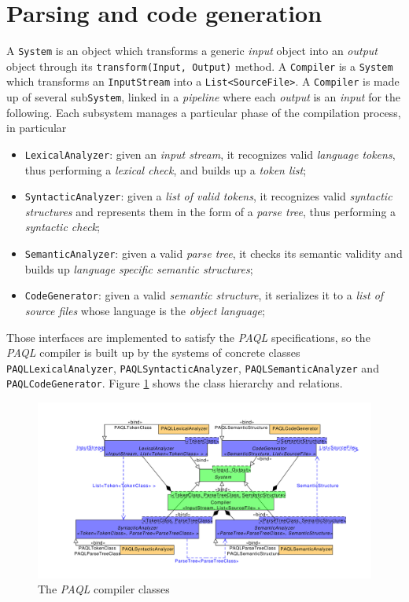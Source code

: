 \documentclass[10pt]{article}  %
\begin{document}
\section{Parsing and code generation}
    A \texttt{System} is an object which transforms a generic \emph{input} object into an \emph{output} object
    through its \texttt{transform(Input, Output)} method. A \texttt{Compiler} is a \texttt{System} which transforms an \texttt{InputStream}
    into a \texttt{List<SourceFile>}. A \texttt{Compiler} is made up of several sub\texttt{System}, linked in a \emph{pipeline} where
    each \emph{output} is an \emph{input} for the following. Each subsystem manages a particular phase of the compilation process,
    in particular
    \begin{itemize}
        \item \texttt{LexicalAnalyzer}: given an \emph{input stream}, it recognizes valid \emph{language tokens}, thus performing a
        \emph{lexical check}, and builds up a \emph{token list};
        \item \texttt{SyntacticAnalyzer}: given a \emph{list of valid tokens}, it recognizes valid \emph{syntactic structures}
        and represents them in the form of a \emph{parse tree}, thus performing a \emph{syntactic check};
        \item \texttt{SemanticAnalyzer}: given a valid \emph{parse tree}, it checks its semantic validity and builds up
        \emph{language specific semantic structures};
        \item \texttt{CodeGenerator}: given a valid \emph{semantic structure}, it serializes it to a \emph{list of source files}
        whose language is the \emph{object language};
    \end{itemize}
    Those interfaces are implemented to satisfy the \emph{PAQL} specifications, so the \emph{PAQL} compiler is built up by
    the systems of concrete classes \texttt{PAQLLexicalAnalyzer}, \texttt{PAQLSyntacticAnalyzer}, \texttt{PAQLSemanticAnalyzer} and
    \texttt{PAQLCodeGenerator}. Figure \ref{fig:compiler} shows the class hierarchy and relations.
    \begin{figure}[htbp]
    \hspace{-7em}
        \includegraphics[scale=0.45]{Compiler.pdf}
        \caption{The \emph{PAQL} compiler classes}\label{fig:compiler}
    \end{figure}
\end{document}
